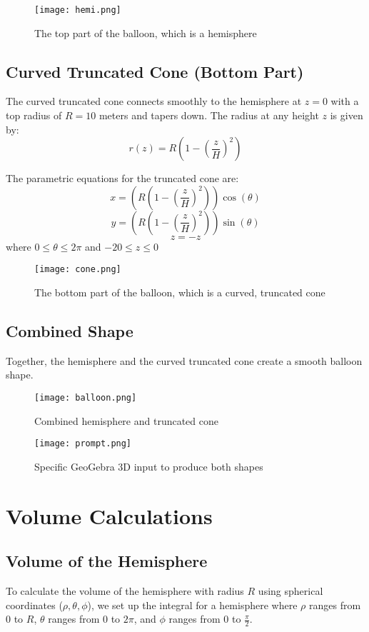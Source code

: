 \documentclass{article}
\begin{document}
\begin{figure}[H]
    \centering
    \texttt{[image: hemi.png]}
    \caption{The top part of the balloon, which is a hemisphere}
    \label{fig:1}
\end{figure}

\subsection*{Curved Truncated Cone (Bottom Part)}
The curved truncated cone connects smoothly to the hemisphere at \( z = 0 \) with a top radius of \( R = 10 \) meters and tapers down. The radius at any height \( z \) is given by:
\[
r(z) = R \left(1 - \left(\frac{z}{H}\right)^2\right)
\]

The parametric equations for the truncated cone are:
\[
x = \left(R \left(1 - \left(\frac{z}{H}\right)^2\right)\right) \cos(\theta)
\]
\[
y = \left(R \left(1 - \left(\frac{z}{H}\right)^2\right)\right) \sin(\theta)
\]
\[
z = -z
\]
where \( 0 \leq \theta \leq 2\pi \) and  \( -20 \leq z \leq 0 \)

\begin{figure}[H]
    \centering
    \texttt{[image: cone.png]}
    \caption{The bottom part of the balloon, which is a curved, truncated cone}
    \label{fig:2}
\end{figure}

\subsection*{Combined Shape}
Together, the hemisphere and the curved truncated cone create a smooth balloon shape.

\begin{figure}[H]
    \centering
    \texttt{[image: balloon.png]}
    \caption{Combined hemisphere and truncated cone}
    \label{fig:3}
\end{figure}
\begin{figure}[H]
    \centering
    \texttt{[image: prompt.png]}
    \caption{Specific GeoGebra 3D input to produce both shapes}
    \label{fig:4}
\end{figure}

\section*{Volume Calculations}

\subsection*{Volume of the Hemisphere}
To calculate the volume of the hemisphere with radius \( R \) using spherical coordinates (\( \rho, \theta, \phi \)), we set up the integral for a hemisphere where \( \rho \) ranges from \( 0 \) to \( R \), \( \theta \) ranges from \( 0 \) to \( 2\pi \), and \( \phi \) ranges from \( 0 \) to \( \frac{\pi}{2} \).
\end{document}
